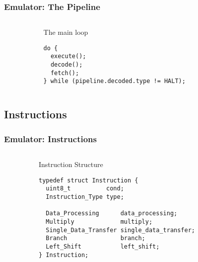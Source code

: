 \documentclass{beamer}
\begin{document}
\begin{frame}[fragile]
\frametitle{Emulator: The Pipeline}

\begin{columns}

\begin{column}{0.05\textwidth}
\end{column}

\begin{column}{0.80\textwidth}
\begin{block}{The main loop}
\begin{verbatim}
do {
  execute();
  decode();
  fetch();
} while (pipeline.decoded.type != HALT);
\end{verbatim}
\end{block}
\end{column}

\begin{column}{0.05\textwidth}
\end{column}

\end{columns}

\end{frame}
\subsection{Instructions}
\begin{frame}[fragile]
\frametitle{Emulator: Instructions}

\begin{columns}

\begin{column}{0.05\textwidth}
\end{column}

\begin{column}{0.90\textwidth}
\begin{block}{Instruction Structure}
\begin{verbatim}
typedef struct Instruction {
  uint8_t          cond;
  Instruction_Type type;

  Data_Processing      data_processing;
  Multiply             multiply;
  Single_Data_Transfer single_data_transfer;
  Branch               branch;
  Left_Shift           left_shift;
} Instruction;
\end{verbatim}
\end{block}
\end{column}

\begin{column}{0.05\textwidth}
\end{column}

\end{columns}

\end{frame}
\end{document}
